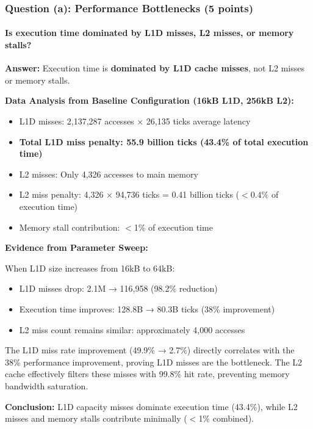 \documentclass[11pt,a4paper]{article}
\begin{document}
\subsubsection{Question (a): Performance Bottlenecks (5 points)}

\paragraph{Is execution time dominated by L1D misses, L2 misses, or memory stalls?}

\textbf{Answer:} Execution time is \textbf{dominated by L1D cache misses}, not L2 misses or memory stalls.

\textbf{Data Analysis from Baseline Configuration (16kB L1D, 256kB L2):}

\begin{itemize}[noitemsep]
    \item L1D misses: 2,137,287 accesses × 26,135 ticks average latency
    \item \textbf{Total L1D miss penalty: 55.9 billion ticks (43.4\% of total execution time)}
    \item L2 misses: Only 4,326 accesses to main memory
    \item L2 miss penalty: 4,326 × 94,736 ticks = 0.41 billion ticks ($<0.4\%$ of execution time)
    \item Memory stall contribution: $<$1\% of execution time
\end{itemize}

\textbf{Evidence from Parameter Sweep:}

When L1D size increases from 16kB to 64kB:
\begin{itemize}[noitemsep]
    \item L1D misses drop: 2.1M → 116,958 (98.2\% reduction)
    \item Execution time improves: 128.8B → 80.3B ticks (38\% improvement)
    \item L2 miss count remains similar: approximately 4,000 accesses
\end{itemize}

The L1D miss rate improvement (49.9\% → 2.7\%) directly correlates with the 38\% performance improvement, proving L1D misses are the bottleneck. The L2 cache effectively filters these misses with 99.8\% hit rate, preventing memory bandwidth saturation.

\textbf{Conclusion:} L1D capacity misses dominate execution time (43.4\%), while L2 misses and memory stalls contribute minimally ($<$1\% combined).
\end{document}
